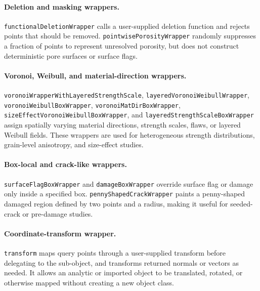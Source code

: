 \paragraph{Deletion and masking wrappers.}\texttt{functionalDeletionWrapper} calls a user-supplied deletion function and rejects points that should be removed.  \texttt{pointwisePorosityWrapper} randomly suppresses a fraction of points to represent unresolved porosity, but does not construct deterministic pore surfaces or surface flags.

\paragraph{Voronoi, Weibull, and material-direction wrappers.}\texttt{voronoiWrapperWithLayeredStrengthScale}, \texttt{layeredVoronoiWeibullWrapper}, \texttt{voronoiWeibullBoxWrapper}, \texttt{voronoiMatDirBoxWrapper}, \texttt{sizeEffectVoronoiWeibullBoxWrapper}, and \texttt{layeredStrengthScaleBoxWrapper} assign spatially varying material directions, strength scales, flaws, or layered Weibull fields.  These wrappers are used for heterogeneous strength distributions, grain-level anisotropy, and size-effect studies.

\paragraph{Box-local and crack-like wrappers.}\texttt{surfaceFlagBoxWrapper} and \texttt{damageBoxWrapper} override surface flag or damage only inside a specified box.  \texttt{pennyShapedCrackWrapper} paints a penny-shaped damaged region defined by two points and a radius, making it useful for seeded-crack or pre-damage studies.

\paragraph{Coordinate-transform wrapper.}\texttt{transform} maps query points through a user-supplied transform before delegating to the sub-object, and transforms returned normals or vectors as needed.  It allows an analytic or imported object to be translated, rotated, or otherwise mapped without creating a new object class.
